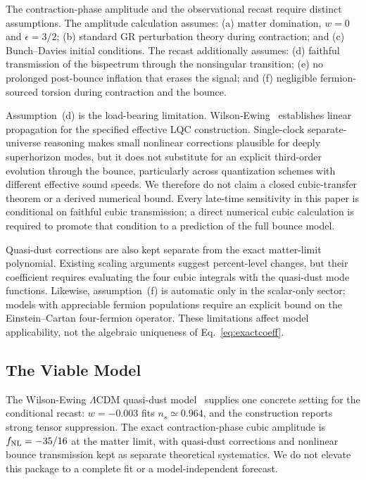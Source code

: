 \documentclass[aps,prd,twocolumn,superscriptaddress,showpacs,preprintnumbers,nofootinbib,longbibliography,floatfix]{revtex4-2}
\newcommand{\fnl}{f_{\rm NL}}
\begin{document}
The contraction-phase amplitude and the observational recast require distinct assumptions. The amplitude calculation assumes: (a) matter domination, $w=0$ and $\epsilon=3/2$; (b) standard GR perturbation theory during contraction; and (c) Bunch--Davies initial conditions. The recast additionally assumes: (d) faithful transmission of the bispectrum through the nonsingular transition; (e) no prolonged post-bounce inflation that erases the signal; and (f) negligible fermion-sourced torsion during contraction and the bounce.

Assumption~(d) is the load-bearing limitation. Wilson-Ewing~\cite{WilsonEwing:2012} establishes linear propagation for the specified effective LQC construction. Single-clock separate-universe reasoning makes small nonlinear corrections plausible for deeply superhorizon modes, but it does not substitute for an explicit third-order evolution through the bounce, particularly across quantization schemes with different effective sound speeds. We therefore do not claim a closed cubic-transfer theorem or a derived numerical bound. Every late-time sensitivity in this paper is conditional on faithful cubic transmission; a direct numerical cubic calculation is required to promote that condition to a prediction of the full bounce model.

Quasi-dust corrections are also kept separate from the exact matter-limit polynomial. Existing scaling arguments suggest percent-level changes, but their coefficient requires evaluating the four cubic integrals with the quasi-dust mode functions. Likewise, assumption~(f) is automatic only in the scalar-only sector; models with appreciable fermion populations require an explicit bound on the Einstein--Cartan four-fermion operator. These limitations affect model applicability, not the algebraic uniqueness of Eq.~\eqref{eq:exactcoeff}.
\subsection{The Viable Model}

The Wilson-Ewing $\Lambda$CDM quasi-dust model~\cite{WilsonEwing:2012} supplies one concrete setting for the conditional recast: $w=-0.003$ fits $n_s\simeq0.964$, and the construction reports strong tensor suppression. The exact contraction-phase cubic amplitude is $\fnl=-35/16$ at the matter limit, with quasi-dust corrections and nonlinear bounce transmission kept as separate theoretical systematics. We do not elevate this package to a complete fit or a model-independent forecast.
\end{document}
